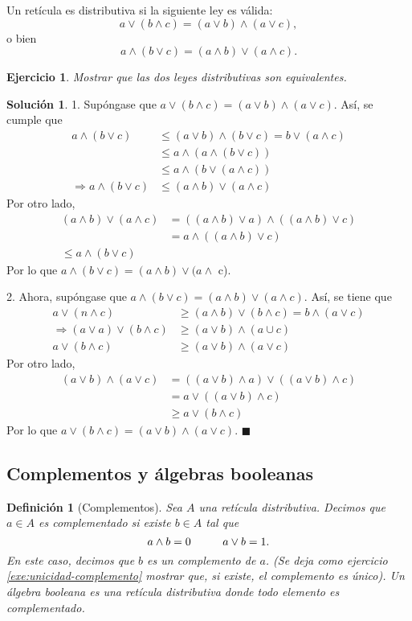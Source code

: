 \documentclass[12pt,letterpaper,titlepage]{article}
\newcommand{\xqed}[1]{%
  \leavevmode\unskip\penalty9999 \hbox{}\nobreak\hfill
  \quad\hbox{\ensuremath{#1}}}
\newtheorem*{defn}{Definición}
\newtheorem{exe}{Ejercicio}
\theoremstyle{definition}
\newtheorem*{soltemp}{Solución}
\newenvironment{sol}[1]{%
    \begin{soltemp}#1}{%
    \xqed{\blacksquare}\end{soltemp}%
}
\renewcommand\sup{\vee}
\renewcommand\inf{\wedge}
\newcommand\<{\langle}
\renewcommand\>{\rangle}
\begin{document}
Un retícula es distributiva si la siguiente ley es
válida:
\[
  a\sup(b\inf c) = (a\sup b)\inf (a\sup c)
,\]
o bien
\[
  a\inf(b\sup c) = (a\inf b)\sup(a\inf c)
.\]
\begin{exe}%
  Mostrar que las dos leyes distributivas son equivalentes.
\end{exe}
\begin{sol}
    1. Supóngase que $a\sup(b\inf c)=(a\sup b)\inf(a\sup c)$. Así, se cumple que
    \begin{align*}
        a\inf(b\sup c)&\leq (a\sup b)\inf(b\sup c)=b\sup(a\inf c)\\
        &\leq a\inf(a\inf(b\sup c))\\
        &\leq a\inf(b\sup(a\inf c))\\
        \Rightarrow a\inf(b\sup c)&\leq (a\inf b)\sup(a\inf c)
    \end{align*}
    Por otro lado, 
    \begin{align*}
        (a\inf b)\sup (a\inf c)&=((a\inf b)\sup a)\inf((a\inf b)\sup c)\\
        &=a\inf((a\inf b)\sup c)\\
        \leq a\inf(b\sup c)
    \end{align*}
Por lo que $a\inf(b\sup c)=(a\inf b)\sup(a\inf$ c).\vspace{3mm}

2. Ahora, supóngase que $a\inf(b\sup c)=(a\inf b)\sup(a\inf c) $. Así, se tiene que
\begin{align*}
    a\sup(n\inf c)&\geq(a\inf b)\sup(b\inf c)=b\inf(a\sup c)\\
    \Rightarrow (a\sup a) \sup (b\inf c) &\geq (a\sup b)\inf(a\cup c)\\
    a\sup(b\inf c)&\geq (a\sup b)\inf(a\sup c)
\end{align*}
Por otro lado, 
\begin{align*}
    (a\sup b)\inf(a\sup c)&=((a\sup b)\inf a)\sup((a\sup b)\inf c)\\
    &=a\sup((a\sup b)\inf c)\\
    &\geq a\sup(b\inf c)
\end{align*}
Por lo que $a\sup(b\inf c)=(a\sup b)\inf(a\sup c)$.
\end{sol}

\subsection{Complementos y álgebras booleanas}

\begin{defn}[Complementos]
    Sea $A$ una retícula distributiva.
    Decimos que $a\in A$ es complementado si existe $b\in A$ tal que
    \[
        a\inf b = 0 \hspace{10mm} a\sup b = 1
    .\]
    En este caso, decimos que $b$ es un complemento de $a$.
    (Se deja como ejercicio \ref{exe:unicidad-complemento}
    mostrar que, si existe, el
    complemento es único).
    Un álgebra booleana es una retícula distributiva
    donde todo elemento es complementado.
\end{defn}
\end{document}
